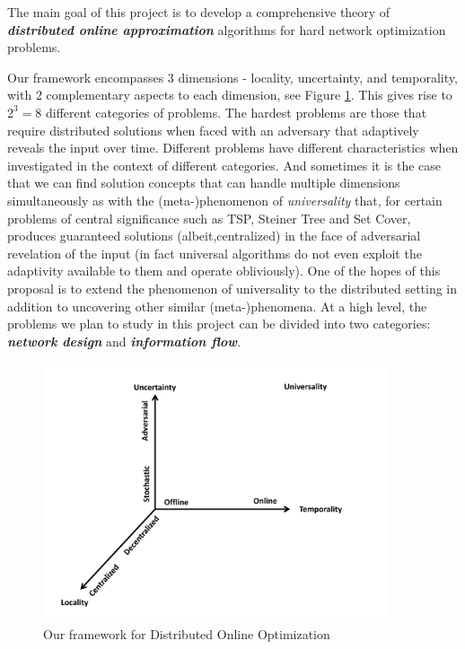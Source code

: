 The main goal of this project is to develop a comprehensive theory of
{\bf \em distributed online approximation}\/ algorithms for hard network
optimization problems.

Our framework encompasses 3 dimensions - locality, uncertainty, and temporality, 
with 2 complementary aspects to each dimension, see Figure \ref{fig:dimensions}. 
This gives rise to $2^3 = 8$ different categories of problems. 
The hardest problems are those that require distributed solutions when 
faced with an adversary that adaptively reveals the input over time. Different
problems have different characteristics when investigated in the context of
different categories. And sometimes it is the case that we can find solution
concepts that can handle multiple dimensions simultaneously as with the
(meta-)phenomenon of {\em universality} \cite{} that, for certain problems of central
significance such as TSP, Steiner Tree and Set Cover, produces guaranteed solutions 
(albeit,centralized)
in the face of adversarial revelation of the input (in fact universal algorithms
do not even exploit the adaptivity available to them and operate obliviously).  
One of the hopes of this proposal is to extend the phenomenon of universality to
the distributed setting in addition to uncovering other similar (meta-)phenomena.
At a high level, the problems we plan to study in this project can be
divided into two categories: {\bf \em network design}\/ and {\bf \em
information flow}.

\begin{figure}
\centering
\includegraphics[width=4in]{dimensions.pdf}
\vspace{-0.5in}
\caption{Our framework for Distributed Online Optimization}
\label{fig:dimensions}
\end{figure}

